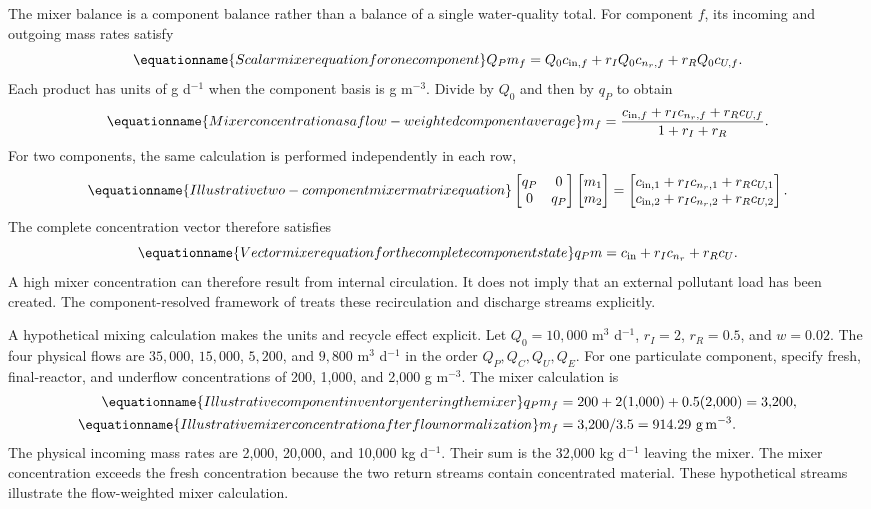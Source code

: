 The mixer balance is a component balance rather than a balance of a single water-quality total. For component $f$, its incoming and outgoing mass rates satisfy
\begin{equation}
\equationname{Scalar mixer equation for one component}
Q_Pm_f=Q_0c_{{\rm in},f}+r_IQ_0c_{n_r,f}+r_RQ_0c_{U,f}.
\end{equation}
Each product has units of g d$^{-1}$ when the component basis is g m$^{-3}$. Divide by $Q_0$ and then by $q_P$ to obtain
\begin{equation}
\equationname{Mixer concentration as a flow-weighted component average}
m_f=\frac{c_{{\rm in},f}+r_Ic_{n_r,f}+r_Rc_{U,f}}{1+r_I+r_R}.
\end{equation}
For two components, the same calculation is performed independently in each row,
\begin{equation}
\equationname{Illustrative two-component mixer matrix equation}
\begin{bmatrix}q_P&0\\0&q_P\end{bmatrix}
\begin{bmatrix}m_1\\m_2\end{bmatrix}
=\begin{bmatrix}c_{{\rm in},1}+r_Ic_{n_r,1}+r_Rc_{U,1}\\
c_{{\rm in},2}+r_Ic_{n_r,2}+r_Rc_{U,2}\end{bmatrix}.
\end{equation}
The complete concentration vector therefore satisfies
\begin{equation}
\equationname{Vector mixer equation for the complete component state}
q_Pm=c_{\rm in}+r_Ic_{n_r}+r_Rc_U.
\label{eq:plant_mixer}
\end{equation}
A high mixer concentration can therefore result from internal circulation. It does not imply that an external pollutant load has been created. The component-resolved framework of \citet{Zhang2026} treats these recirculation and discharge streams explicitly.

A hypothetical mixing calculation makes the units and recycle effect explicit. Let $Q_0=10{,}000$ m$^3$ d$^{-1}$, $r_I=2$, $r_R=0.5$, and $w=0.02$. The four physical flows are $35{,}000$, $15{,}000$, $5{,}200$, and $9{,}800$ m$^3$ d$^{-1}$ in the order $Q_P,Q_C,Q_U,Q_E$. For one particulate component, specify fresh, final-reactor, and underflow concentrations of 200, 1{,}000, and 2{,}000 g m$^{-3}$. The mixer calculation is
\begin{align}
\equationname{Illustrative component inventory entering the mixer}
q_Pm_f&=200+2(1{,}000)+0.5(2{,}000)=3{,}200,\\
\equationname{Illustrative mixer concentration after flow normalization}
m_f&=3{,}200/3.5=914.29\ \mathrm{g\,m^{-3}}.
\end{align}
The physical incoming mass rates are 2{,}000, 20{,}000, and 10{,}000 kg d$^{-1}$. Their sum is the 32{,}000 kg d$^{-1}$ leaving the mixer. The mixer concentration exceeds the fresh concentration because the two return streams contain concentrated material. These hypothetical streams illustrate the flow-weighted mixer calculation.

